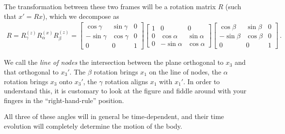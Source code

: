 \documentclass[main.tex]{subfiles}
\begin{document}
The transformation between these two frames will be a rotation matrix \(R\) (such that \(x' = R x\)), which we decompose as 
%
\begin{align}
R = R_{\gamma }^{(z)} R_{\alpha }^{(x)} R_{\beta }^{(z)} 
= \left[\begin{array}{ccc}
\cos \gamma  & \sin \gamma  & 0 \\ 
- \sin \gamma  & \cos \gamma  & 0 \\ 
0 & 0 & 1
\end{array}\right]
\left[\begin{array}{ccc}
1 & 0 & 0 \\ 
0 & \cos \alpha  & \sin \alpha  \\ 
0 & -\sin \alpha  & \cos \alpha 
\end{array}\right]
\left[\begin{array}{ccc}
\cos \beta  & \sin \beta  & 0 \\ 
- \sin \beta  & \cos \beta  & 0 \\ 
0 & 0 & 1
\end{array}\right]
\,.
\end{align}

We call the \emph{line of nodes} the intersection between the plane orthogonal to \(x_3 \) and that orthogonal to \(x_3'\).
The \(\beta \) rotation brings \(x_1 \) on the line of nodes, the \(\alpha \) rotation brings \(x_3 \) onto \(x_3'\), the \(\gamma \) rotation aligns \(x_1 \) with \(x_1'\). 
In order to understand this, it is customary to look at the figure \cite[fig.\ 4.15]{maggioreGravitationalWavesVolume2007} and fiddle around with your fingers in the ``right-hand-rule'' position. 

All three of these angles will in general be time-dependent, and their time evolution will completely determine the motion of the body.
\end{document}
